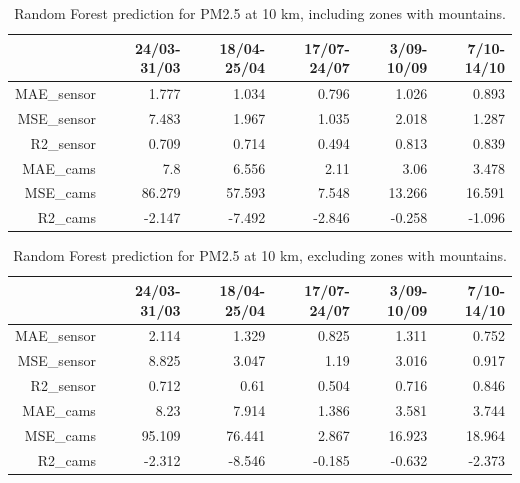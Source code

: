 \begin{table}[H]
\begin{tabular}{rrrrrr}
\hline
       &   24/03-31/03 &   18/04-25/04 &   17/07-24/07 &   3/09-10/09 &   7/10-14/10 \\
\hline
   MAE\_sensor   &1.777 &1.034 &0.796 &1.026 &0.893 \\
   MSE\_sensor   &7.483 &            1.967 &            1.035 &            2.018 &            1.287 \\
   R2\_sensor    & 0.709 &            0.714 &            0.494 &            0.813 &            0.839 \\
   MAE\_cams     &7.8   &            6.556 &            2.11  &            3.06  &3.478 \\
   MSE\_cams     &86.279 &           57.593 &            7.548 &           13.266 &16.591 \\
   R2\_cams&-2.147 &           -7.492 &           -2.846 &           -0.258 &           -1.096 \\
\hline
\end{tabular}
\caption{Random Forest prediction for PM2.5 at 10 km, including zones with mountains.}
\end{table}
\bigskip
\begin{table}[H]
\begin{tabular}{rrrrrr}
\hline
      &   24/03-31/03 &   18/04-25/04 &   17/07-24/07 &   3/09-10/09 &   7/10-14/10 \\
\hline
  MAE\_sensor   &            2.114 &            1.329 &            0.825 &            1.311 &            0.752 \\
  MSE\_sensor   &            8.825 &            3.047 &            1.19  &            3.016 &            0.917 \\
  R2\_sensor    &            0.712 &            0.61  &            0.504 &            0.716 &            0.846 \\
  MAE\_cams     &            8.23  &            7.914 &            1.386 &            3.581 &            3.744 \\
   MSE\_cams     &           95.109 &           76.441 &            2.867 &           16.923 &           18.964 \\
   R2\_cams      &           -2.312 &           -8.546 &           -0.185 &           -0.632 &           -2.373 \\
\hline
\end{tabular}
\caption{Random Forest prediction for PM2.5 at 10 km, excluding zones with mountains.}
\end{table}


